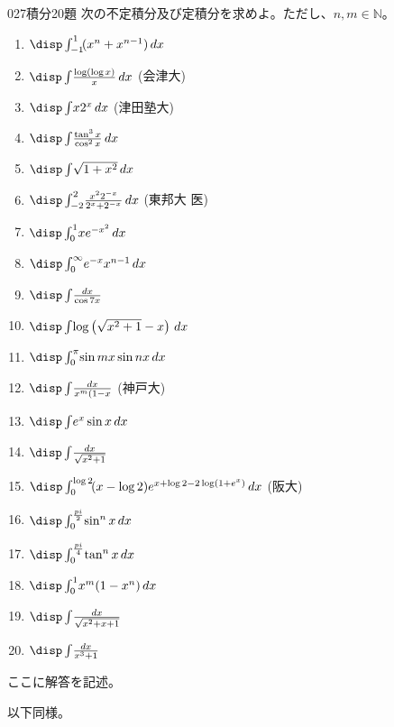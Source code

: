 \begin{prob}{027}{}{積分20題}
 次の不定積分及び定積分を求めよ。ただし、$n, m\in\mathbb{N}$。
 \begin{enumerate}
  \item $\disp \int_{-1}^1\! (x^n+x^{n-1}) \,dx$
  \item $\disp \int\! \frac{\log\left(\log x\right)}{x} \,dx$ (会津大)
  \item $\disp \int\! x2^x \,dx$ (津田塾大)
  \item $\disp \int\! \frac{\tan^3 x}{\cos^2 x} \,dx$
  \item $\disp \int\! \sqrt{1+x^2} \,dx$
  \item $\disp \int_{-2}^2\! \frac{x^2 2^{-x}}{2^x+2^{-x}} \,dx$ (東邦大 医)
  \item $\disp \int_0^1\! xe^{-x^2} \,dx$
  \item $\disp \int_0^\infty\! e^{-x}x^{n-1} \,dx$
  \item $\disp \int\! \frac{dx}{\cos 7x}$
  \item $\disp \int\! \log\left(\sqrt{x^2+1}-x\right) \,dx$
  \item $\disp \int_0^\pi\! \sin mx \sin nx \,dx$
  \item $\disp \int\! \frac{dx}{x^m(1-x}$ (神戸大)
  \item $\disp \int\! e^x\sin x \,dx$
  \item $\disp \int\! \frac{dx}{\sqrt{x^2+1}}$
  \item $\disp \int_0^{\log 2}\! (x-\log 2)e^{x+\log 2 -2\log (1+e^x)} \,dx$ (阪大)
  \item $\disp \int_0^{\frac{pi}{2}}\! \sin^n x \,dx$
  \item $\disp \int_0^{\frac{pi}{4}}\! \tan^n x \,dx$
  \item $\disp \int_0^1\! x^m(1-x^n) \,dx$
  \item $\disp \int\! \frac{dx}{\sqrt{x^2+x+1}}$
  \item $\disp \int\! \frac{dx}{x^3+1}$
 \end{enumerate}
\end{prob}
ここに解答を記述。

以下同様。